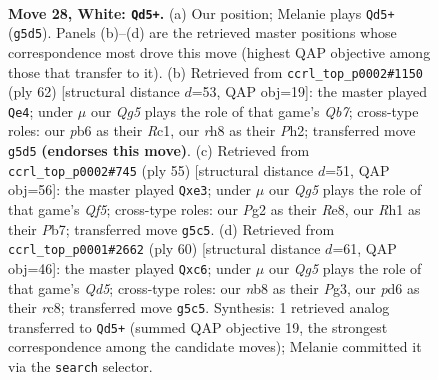 \documentclass[11pt]{article}
\begin{document}
\clearpage

\begin{figure}[p]\centering
\begin{subfigure}{0.46\textwidth}\centering
\resizebox{\linewidth}{!}{%
\newchessgame
\chessboard[
  setfen={rn5r/5k2/1p1p1q2/pPp3Q1/4P3/7P/RP4P1/2K4R w - - 0 28},
  showmover=false,
  pgfstyle=straightmove, color=movearrow, markmove={g5-d5}
]}
\caption{}
\end{subfigure}\hfill
\begin{subfigure}{0.46\textwidth}\centering
\resizebox{\linewidth}{!}{%
\newchessgame
\chessboard[
  setfen={4r1k1/pQ4p1/1p2pq1p/8/8/3r1PP1/PP2R1KP/2R5 w - - 7 32},
  showmover=false,
  pgfstyle=straightmove, color=movearrow, markmove={b7-e4}
]}
\caption{}
\end{subfigure}
\\[4pt]
\begin{subfigure}{0.46\textwidth}\centering
\resizebox{\linewidth}{!}{%
\newchessgame
\chessboard[
  setfen={4rk2/1p6/2p3p1/p7/P2Ppq2/4Q1R1/1P3P1P/6K1 b - - 3 28},
  showmover=false,
  pgfstyle=straightmove, color=movearrow, markmove={f4-e3}
]}
\caption{}
\end{subfigure}\hfill
\begin{subfigure}{0.46\textwidth}\centering
\resizebox{\linewidth}{!}{%
\newchessgame
\chessboard[
  setfen={2r3k1/p4pp1/2q4p/3Q1R2/7P/2r3P1/P4PK1/4R3 w - - 2 31},
  showmover=false,
  pgfstyle=straightmove, color=movearrow, markmove={d5-c6}
]}
\caption{}
\end{subfigure}
\caption{\textbf{Move 28, White: \texttt{Qd5+}.} (a) Our position; Melanie plays \texttt{Qd5+} (\texttt{g5d5}). Panels (b)--(d) are the retrieved master positions whose correspondence most drove this move (highest QAP objective among those that transfer to it). (b) Retrieved from \texttt{ccrl\_top\_p0002\#1150} (ply 62) [structural distance $d$=53, QAP obj=19]: the master played \texttt{Qe4}; under $\mu$ our \emph{Qg5} plays the role of that game's \emph{Qb7}; cross-type roles: our \emph{p}b6 as their \emph{R}c1, our \emph{r}h8 as their \emph{P}h2; transferred move \texttt{g5d5} \textbf{(endorses this move)}. (c) Retrieved from \texttt{ccrl\_top\_p0002\#745} (ply 55) [structural distance $d$=51, QAP obj=56]: the master played \texttt{Qxe3}; under $\mu$ our \emph{Qg5} plays the role of that game's \emph{Qf5}; cross-type roles: our \emph{P}g2 as their \emph{R}e8, our \emph{R}h1 as their \emph{P}b7; transferred move \texttt{g5c5}. (d) Retrieved from \texttt{ccrl\_top\_p0001\#2662} (ply 60) [structural distance $d$=61, QAP obj=46]: the master played \texttt{Qxc6}; under $\mu$ our \emph{Qg5} plays the role of that game's \emph{Qd5}; cross-type roles: our \emph{n}b8 as their \emph{P}g3, our \emph{p}d6 as their \emph{r}c8; transferred move \texttt{g5c5}. Synthesis: 1 retrieved analog transferred to \texttt{Qd5+} (summed QAP objective 19, the strongest correspondence among the candidate moves); Melanie committed it via the \texttt{search} selector.}
\label{fig:thought-m54}
\end{figure}
\end{document}
